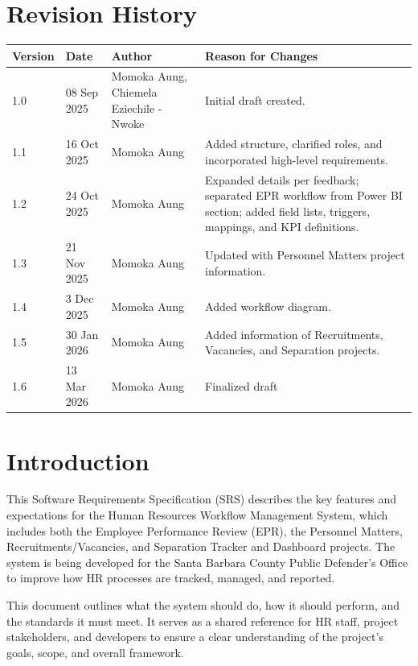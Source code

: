 \documentclass[12pt]{article}
\begin{document}
\section*{Revision History}

\renewcommand{\arraystretch}{1.3}
\begin{center}
\begin{tabular}{|p{2cm}|p{3cm}|p{3.5cm}|p{7cm}|}
\hline
\textbf{Version} & \textbf{Date} & \textbf{Author} & \textbf{Reason for Changes} \\ \hline
1.0 & 08 Sep 2025 & Momoka Aung, Chiemela Eziechile - Nwoke & Initial draft created. \\ \hline
1.1 & 16 Oct 2025 & Momoka Aung & Added structure, clarified roles, and incorporated high-level requirements. \\ \hline
1.2 & 24 Oct 2025 & Momoka Aung & Expanded details per feedback; separated EPR workflow from Power BI section; added field lists, triggers, mappings, and KPI definitions. \\ \hline
1.3 & 21 Nov 2025 & Momoka Aung & Updated with Personnel Matters project information. \\ \hline
1.4 & 3 Dec 2025 & Momoka Aung & Added workflow diagram. \\ \hline
1.5 & 30 Jan 2026 & Momoka Aung & Added information of Recruitments, Vacancies, and Separation projects.  \\ \hline
1.6 & 13 Mar 2026 & Momoka Aung & Finalized draft  \\ \hline
\end{tabular}
\end{center}


\section{Introduction}

This Software Requirements Specification (SRS) describes the key features and expectations for the Human Resources Workflow Management System, which includes both the Employee Performance Review (EPR), the Personnel Matters, Recruitments/Vacancies, and Separation Tracker and Dashboard projects. The system is being developed for the Santa Barbara County Public Defender’s Office to improve how HR processes are tracked, managed, and reported.

This document outlines what the system should do, how it should perform, and the standards it must meet. It serves as a shared reference for HR staff, project stakeholders, and developers to ensure a clear understanding of the project’s goals, scope, and overall framework.
\end{document}
